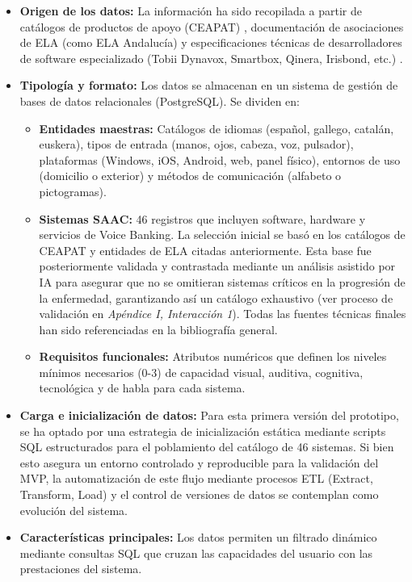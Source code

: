 \begin{itemize}
    	\item \textbf{Origen de los datos:} La información ha sido recopilada a partir de catálogos de productos de apoyo (CEAPAT) \cite{ceapat:productos}, documentación de asociaciones de ELA (como ELA Andalucía)\break  \cite{elaandalucia:guia} y especificaciones técnicas de desarrolladores 		de software especializado (Tobii Dynavox, 	Smartbox, Qinera, Irisbond, etc.) \cite{tobiidynavox:products,qinera:caa,irisbond:soluciones}.
    	\item \textbf{Tipología y formato:} Los datos se almacenan en un sistema de gestión de bases de datos relacionales (PostgreSQL). Se dividen en:
    \begin{itemize}
	\item \textbf{Entidades maestras:} Catálogos de idiomas (español, gallego, catalán, euskera), tipos de entrada (manos, ojos, cabeza, voz, pulsador), plataformas (Windows, iOS, Android, web, panel físico), entornos de uso (domicilio o exterior) y métodos de comunicación (alfabeto o 		pictogramas).
	\item \textbf{Sistemas SAAC:} 46 registros que incluyen software, hardware y servicios de Voice Banking. La selección inicial se basó en los catálogos de CEAPAT y entidades de ELA citadas anteriormente. Esta base fue posteriormente validada y contrastada mediante un análisis 			asistido por IA para asegurar que no se omitieran sistemas críticos en la progresión de la enfermedad, garantizando así un catálogo exhaustivo (ver proceso de validación en \textit{Apéndice I, Interacción 1}). Todas las fuentes técnicas finales han sido referenciadas en la 				bibliografía general.
        	\item \textbf{Requisitos funcionales:} Atributos numéricos que definen los niveles mínimos necesarios (0-3) de capacidad visual, auditiva, cognitiva, tecnológica y de habla para cada sistema.
    \end{itemize}
    	\item \textbf{Carga e inicialización de datos:} Para esta primera versión del prototipo, se ha optado por una estrategia de inicialización estática mediante scripts SQL estructurados para el poblamiento del catálogo de 46 sistemas. Si bien esto asegura un entorno controlado y 			reproducible para la validación del MVP, la automatización de este flujo mediante procesos ETL (Extract, Transform, Load) y el control de versiones de datos se contemplan como evolución del sistema.
	\item \textbf{Características principales:} Los datos permiten un filtrado dinámico mediante consultas SQL que cruzan las capacidades del usuario con las prestaciones del sistema.
\end{itemize}

